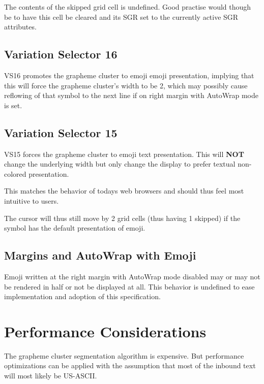 \documentclass{article}
\begin{document}
The contents of the skipped grid cell is undefined. 
Good practise would though be to have this cell be cleared and its SGR set
to the currently active SGR attributes.

\subsection{Variation Selector 16}

VS16 promotes the grapheme cluster to emoji emoji presentation,
implying that this will force the grapheme cluster's width to be 2,
which may possibly cause reflowing of that symbol to the next line
if on right margin with AutoWrap mode is set.

\subsection{Variation Selector 15}

VS15 forces the grapheme cluster to emoji text presentation.
This will \textbf{NOT} change the underlying width
but only change the display to prefer textual non-colored presentation.

This matches the behavior of todays web browsers and should thus
feel most intuitive to users.

The cursor will thus still move by 2 grid cells (thus having 1 skipped)
if the symbol has the default presentation of emoji.

\subsection{Margins and AutoWrap with Emoji}

Emoji written at the right margin with AutoWrap mode disabled
may or may not be rendered in half or not be displayed at all.
This behavior is undefined to ease implementation and adoption 
of this specification.

\section{Performance Considerations}

The grapheme cluster segmentation algorithm is expensive.
But performance optimizations can be applied with the assumption
that most of the inbound text will most likely be US-ASCII.

\end{document}
